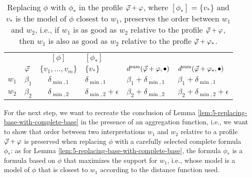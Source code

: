\begin{table}\centering
	\begin{tabular}{m{2.5em} >{\raggedright}m{3em} c >{\raggedright}m{6em} >{\raggedright}m{6em} l}
		\toprule
		&	       &       $[\phi]$     & $[\phi_\ast]$ &  &			 \\
		& $\P$       & $\{v_1,\dots,v_m\}$ & $\{v_\ast\}$   & $\dd^{\ssum}(\P+\phi,\bullet)$ & $\dd^{\ssum}(\P+\phi_\ast,\bullet)$\\\midrule
		$w_1$ & $\beta_1$ &  $\delta_{\min,1}$     & $\delta_{\min,1}$     &     $\beta_1+\delta_{\min,1}$   & $\beta_1+\delta_{\min,1}$\\
		$w_2$ & $\beta_2$ &  $\delta_{\min,2}$  & $\delta_{\min,2}+\epsilon$ & $\beta_2+\delta_{\min,2}$  & $\beta_2+\delta_{\min,2}+\epsilon$\\
		\bottomrule
	\end{tabular}
	\caption{
		Replacing $\phi$ with $\phi_\ast$ in the profile $\P+\phi$, 
		where $[\phi_\ast]=\{v_\ast\}$ and $v_\ast$ 
		is the model of $\phi$ closest to $w_1$,
		preserves the order between $w_1$ and $w_2$,
		i.e., if $w_1$ is as good as $w_2$ relative to the profile $\P+\phi$,
		then $w_1$ is also as good as $w_2$ relative to 
		the profle $\P+\phi_{\ast}$.
		}
	\label{tab:5-replacing-base-in-profile-with-complete-base}
\end{table}		

For the next step, we want to recreate the conclusion of 
Lemma \ref{lem:5-replacing-base-with-complete-base}
in the presence of an aggregation function,
i.e., we want to show that order between two interpretations 
$w_1$ and $w_2$ relative to a profile $\P+\phi$ is preserved 
when replacing $\phi$ with a carefully selected complete formula $\phi_{\ast}$:
as for Lemma \ref{lem:5-replacing-base-with-complete-base}, 
the formula $\phi_{\ast}$ is a formula based on $\phi$ that maximizes the support 
for $w_1$, i.e., whose model is a model of $\phi$ that is closest to
$w_1$ according to the distance function used.

